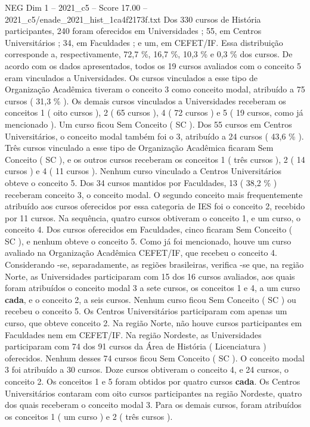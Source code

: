 \begin{textsample}{NEG Dim 1 – 2021\_c5 – Score 17.00 – 2021\_c5/enade\_2021\_hist\_1ca4f2173f.txt}
Dos 330 cursos de História participantes, 240 foram oferecidos em Universidades ; 55, em Centros Universitários ; 34, em Faculdades ; e um, em CEFET/IF.
Essa distribuição corresponde a, respectivamente, 72,7 \%, 16,7 \%, 10,3 \% e 0,3 \% dos cursos.
De acordo com os dados apresentados, todos os 19 cursos avaliados com o conceito 5 eram vinculados a Universidades.
Os cursos vinculados a esse tipo de Organização Acadêmica tiveram o conceito 3 como conceito modal, atribuído a 75 cursos ( 31,3 \% ).
Os demais cursos vinculados a Universidades receberam os conceitos 1 ( oito cursos ), 2 ( 65 cursos ), 4 ( 72 cursos ) e 5 ( 19 cursos, como já mencionado ).
Um curso ficou Sem Conceito ( SC ).
Dos 55 cursos em Centros Universitários, o conceito modal também foi o 3, atribuído a 24 cursos ( 43,6 \% ).
Três cursos vinculado a esse tipo de Organização Acadêmica ficaram Sem Conceito ( SC ), e os outros cursos receberam os conceitos 1 ( três cursos ), 2 ( 14 cursos ) e 4 ( 11 cursos ).
Nenhum curso vinculado a Centros Universitários obteve o conceito 5.
Dos 34 cursos mantidos por Faculdades, 13 ( 38,2 \% ) receberam conceito 3, o conceito modal.
O segundo conceito mais frequentemente atribuído aos cursos oferecidos por essa categoria de IES foi o conceito 2, recebido por 11 cursos.
Na sequência, quatro cursos obtiveram o conceito 1, e um curso, o conceito 4.
Dos cursos oferecidos em Faculdades, cinco ficaram Sem Conceito ( SC ), e nenhum obteve o conceito 5.
Como já foi mencionado, houve um curso avaliado na Organização Acadêmica CEFET/IF, que recebeu o conceito 4.
Considerando -se, separadamente, as regiões brasileiras, verifica -se que, na região Norte, as Universidades participaram com 15 dos 16 cursos avaliados, aos quais foram atribuídos o conceito modal 3 a sete cursos, os conceitos 1 e 4, a um curso \textbf{cada}, e o conceito 2, a seis cursos.
Nenhum curso ficou Sem Conceito ( SC ) ou recebeu o conceito 5.
Os Centros Universitários participaram com apenas um curso, que obteve conceito 2.
Na região Norte, não houve cursos participantes em Faculdades nem em CEFET/IF.
Na região Nordeste, as Universidades participaram com 74 dos 91 cursos da Área de História ( Licenciatura ) oferecidos.
Nenhum desses 74 cursos ficou Sem Conceito ( SC ).
O conceito modal 3 foi atribuído a 30 cursos.
Doze cursos obtiveram o conceito 4, e 24 cursos, o conceito 2.
Os conceitos 1 e 5 foram obtidos por quatro cursos \textbf{cada}.
Os Centros Universitários contaram com oito cursos participantes na região Nordeste, quatro dos quais receberam o conceito modal 3.
Para os demais cursos, foram atribuídos os conceitos 1 ( um curso ) e 2 ( três cursos ).

\end{textsample}
